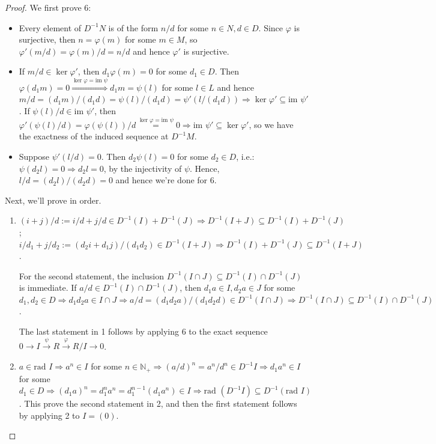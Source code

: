 \begin{proof}
    We first prove 6: 
    \begin{itemize}
        \item Every element of $D^{-1}N$ is of the form $n/d$ for some $n\in N,d\in D$. Since $\varphi$ is surjective, then $n=\varphi(m)$ for some $m\in M$, so $\varphi' (m/d) = \varphi(m)/d=n/d$ and hence $\varphi'$ is surjective.
        \item If $m/d \in \ker \varphi'$, then $d_1\varphi(m)=0$ for some $d_1 \in D$. Then $\varphi (d_1m)=0 \overset{\ker \varphi= \text{im } \psi}{\Longrightarrow} d_1m=\psi(l)$ for some $l \in L$ and hence $m/d=(d_1m)/(d_1d) = \psi(l)/(d_1d) = \psi '(l/(d_1d)) \Rightarrow \ker \varphi' \subseteq \text{im }\psi'$. If $\psi(l)/d \in \text{im }\psi'$, then $\varphi' (\psi(l)/d)= \varphi(\psi(l))/d \overset{\ker \varphi=\text{im }\psi}{=} 0 \Rightarrow \text{im }\psi' \subseteq \ker \varphi'$, so we have the exactness of the induced sequence at $D^{-1}M$.
        \item Suppose $\psi' (l/d)=0$. Then $d_2 \psi(l)=0$ for some $d_2\in D$, i.e.: $\psi(d_2l)=0 \Rightarrow d_2l=0$, by the injectivity of $\psi$. Hence, $l/d= (d_2l)/ (d_2d)=0$ and hence we're done for 6.
    \end{itemize}
    Next, we'll prove in order.
    \begin{enumerate}
        \item $(i+j)/d := i/d+j/d \in D^{-1} (I) + D^{-1}(J) \Rightarrow D^{-1}(I+J) \subseteq D^{-1} (I) + D^{-1}(J)$; $i/d_1 +j/d_2 := (d_2i+d_1j)/ (d_1d_2) \in D^{-1}(I+J) \Rightarrow D^{-1}(I) +D^{-1} (J) \subseteq D^{-1} (I+J)$.
        
        For the second statement, the inclusion $D^{-1} (I\cap J) \subseteq D^{-1} (I) \cap D^{-1}(J)$ is immediate. If $a/d \in D^{-1}(I) \cap D^{-1} (J)$, then $d_1a \in I,d_2 a\in J$ for some $d_1,d_2 \in D \Rightarrow d_1d_2a \in I \cap J \Rightarrow a/d= (d_1d_2a)/ (d_1d_2d) \in D^{-1} (I\cap J) \Rightarrow D^{-1} (I\cap J) \subseteq D^{-1} (I) \cap D^{-1}(J)$.

        The last statement in 1 follows by applying 6 to the exact sequence $0\to I \overset{\psi}{\to} R \overset{\varphi}{\to} R/I \to 0$.

        \item $a\in \text{rad }I \Rightarrow a^n \in I$ for some $n\in \mathbb{N}_+ \Rightarrow (a/d)^n= a^n/d^n \in D^{-1}I \Rightarrow d_1a^n \in I$ for some $d_1 \in D \Rightarrow (d_1a)^n= d_1^na^n= d_1^{n-1} (d_1a^n) \in I \Rightarrow \text{rad } (D^{-1}I) \subseteq D^{-1} (\text{rad }I)$. This prove the second statement in 2, and then the first statement follows by applying 2 to $I=(0)$.


\end{enumerate}
\end{proof}
